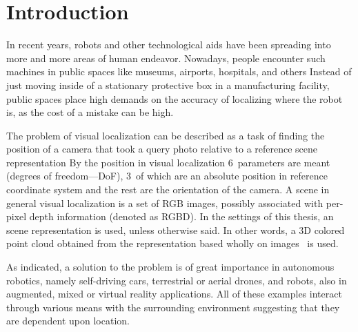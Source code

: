 \chapter*{Introduction} \label{intro}

In recent years, robots and other technological aids have been spreading into more and more
areas of human endeavor. Nowadays, people encounter such machines in public spaces
like museums, airports, hospitals, and others
Instead of just moving inside of a stationary
protective box in a manufacturing facility, public spaces place high demands on
the accuracy of localizing where the robot is, as the cost of a mistake can be high.

The problem of visual localization can be described as a task of finding
the position of a camera that took a query photo relative to a reference scene
representation
By the position in visual localization
6~parameters are meant (degrees of freedom---DoF), 3~of which are an absolute position in
reference coordinate system and the rest are the orientation of the camera.
A scene in general visual localization is a set
of RGB images, possibly associated with per-pixel depth information (denoted as RGBD).
In the settings of this thesis, an  scene representation
is used, unless otherwise said. In other words, a 3D colored point cloud obtained from the 
representation based wholly on images~\citep{SOTARendering} is used.

As indicated, a solution to the problem is of great importance in autonomous robotics,
namely self-driving cars, terrestrial or aerial drones, and robots, also in augmented,
mixed or virtual reality applications. All of these examples interact through various
means with the surrounding environment suggesting that they are dependent upon location.\\

